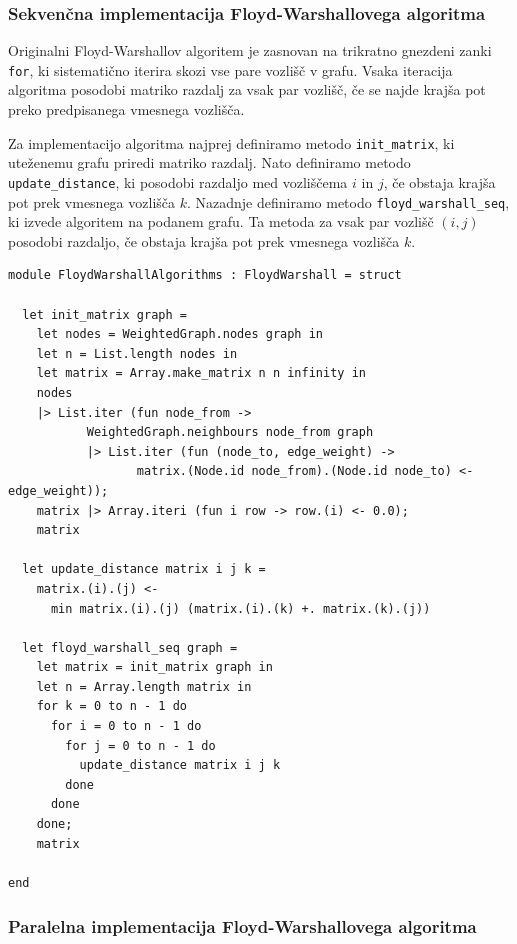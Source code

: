 \documentclass[mat1, tisk]{fmfdelo}
\begin{document}
\subsubsection{Sekvenčna implementacija Floyd-Warshallovega algoritma}

Originalni Floyd-Warshallov algoritem je zasnovan na trikratno gnezdeni zanki \texttt{for}, ki sistematično iterira skozi vse pare vozlišč v grafu.
Vsaka iteracija algoritma posodobi matriko razdalj za vsak par vozlišč, če se najde krajša pot preko predpisanega vmesnega vozlišča.

Za implementacijo algoritma najprej definiramo metodo \texttt{init\_matrix}, ki uteženemu grafu priredi matriko razdalj.
Nato definiramo metodo \texttt{update\_distance}, ki posodobi razdaljo med vozliščema $i$ in $j$, če obstaja krajša pot prek vmesnega vozlišča $k$.
Nazadnje definiramo metodo \texttt{floyd\_warshall\_seq}, ki izvede algoritem na podanem grafu. Ta metoda za vsak par vozlišč $(i, j)$
posodobi razdaljo, če obstaja krajša pot prek vmesnega vozlišča $k$.

\begin{lstlisting}[label=lst:floyd_warshall_seq]
module FloydWarshallAlgorithms : FloydWarshall = struct

  let init_matrix graph =
    let nodes = WeightedGraph.nodes graph in
    let n = List.length nodes in
    let matrix = Array.make_matrix n n infinity in
    nodes
    |> List.iter (fun node_from ->
           WeightedGraph.neighbours node_from graph
           |> List.iter (fun (node_to, edge_weight) ->
                  matrix.(Node.id node_from).(Node.id node_to) <- edge_weight));
    matrix |> Array.iteri (fun i row -> row.(i) <- 0.0);
    matrix
  
  let update_distance matrix i j k =
    matrix.(i).(j) <- 
      min matrix.(i).(j) (matrix.(i).(k) +. matrix.(k).(j))

  let floyd_warshall_seq graph =
    let matrix = init_matrix graph in
    let n = Array.length matrix in
    for k = 0 to n - 1 do
      for i = 0 to n - 1 do
        for j = 0 to n - 1 do
          update_distance matrix i j k
        done
      done
    done;
    matrix

end
\end{lstlisting}


\subsubsection{Paralelna implementacija Floyd-Warshallovega algoritma}
\end{document}
